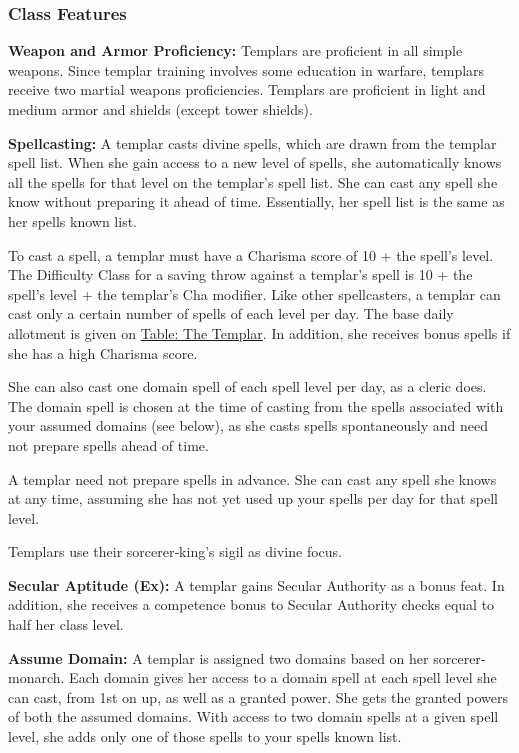 \subsubsection{Class Features}

\textbf{Weapon and Armor Proficiency:} Templars are proficient in all simple weapons. Since templar training involves some education in warfare, templars receive two martial weapons proficiencies. Templars are proficient in light and medium armor and shields (except tower shields).

\textbf{Spellcasting:} A templar casts divine spells, which are drawn from the templar spell list. When she gain access to a new level of spells, she automatically knows all the spells for that level on the templar's spell list. She can cast any spell she know without preparing it ahead of time. Essentially, her spell list is the same as her spells known list.

To cast a spell, a templar must have a Charisma score of 10 + the spell's level. The Difficulty Class for a saving throw against a templar's spell is 10 + the spell's level + the templar's Cha modifier. Like other spellcasters,
a templar can cast only a certain number of spells of each level per day. The base daily allotment is given on \hyperref[tab:The Templar]{Table: The Templar}. In addition, she receives bonus spells if she has a high Charisma score.

She can also cast one domain spell of each spell level per day, as a cleric does. The domain spell is chosen at the time of casting from the spells associated with your assumed domains (see below), as she casts spells spontaneously and need not prepare spells ahead of time.

A templar need not prepare spells in advance. She can cast any spell she knows at any time, assuming she has not yet used up your spells per day for that spell level.

Templars use their sorcerer‐king's sigil as divine focus.

\textbf{Secular Aptitude (Ex):} A templar gains Secular Authority as a bonus feat. In addition, she receives a competence bonus to Secular Authority checks equal to half her class level.

\textbf{Assume Domain:} A templar is assigned two domains based on her sorcerer‐monarch. Each domain gives her access to a domain spell at each spell level she can cast, from 1st on up, as well as a granted power. She gets the granted powers of both the assumed domains. With access to two domain spells at a given spell level, she adds only one of those spells to your spells known list.

